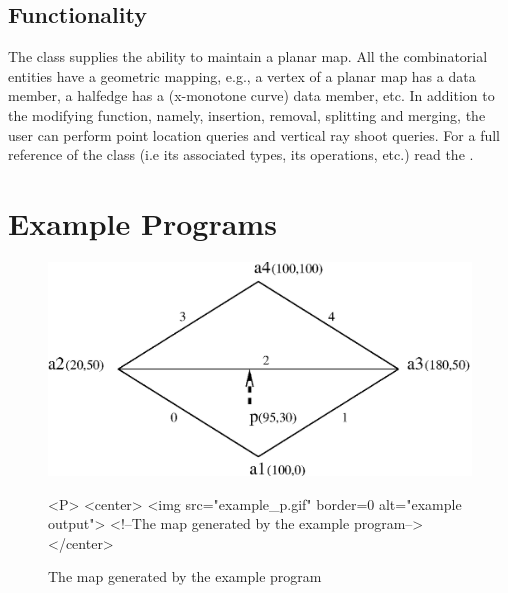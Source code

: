 
\subsection*{Functionality}

The class   supplies the ability to maintain
a planar map. All the combinatorial entities have a geometric mapping, e.g.,
a vertex of a planar map has a  data member, a halfedge has
a  (x-monotone curve) data member, etc. In addition to the 
modifying function, namely, insertion, removal, splitting and merging, the user
can perform point location queries and vertical ray shoot queries.
For a full reference of the class (i.e its associated types,
its operations, etc.) read the .

\section{Example Programs}
\label{PM_sec:example}


\begin{figure}[h]
\begin{ccTexOnly}
    \centerline{
      \includegraphics{example_p.ps}
    }
\end{ccTexOnly}

\caption{The map generated by the example program
\label{PM_sec:example_pic}}

\begin{ccHtmlOnly}
    <P>
    <center>
        <img src="example_p.gif"  border=0 alt="example output">
        <!--The map generated by the example program-->
    </center>
\end{ccHtmlOnly}
\end{figure}

